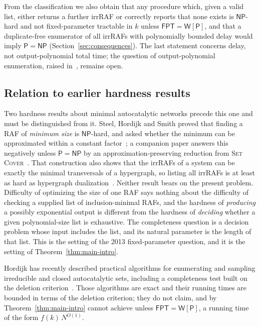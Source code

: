 \documentclass[11pt,a4paper]{article}
\theoremstyle{plain}
\theoremstyle{definition}
\theoremstyle{remark}
\newcommand{\NP}{\mathsf{NP}}
\newcommand{\Ptime}{\mathsf{P}}
\newcommand{\FPT}{\mathsf{FPT}}
\newcommand{\WP}{\mathsf{W[P]}}
\newcommand{\Nlen}{N}
\begin{document}
From the classification we also obtain that any procedure which, given a valid list, either returns a further irrRAF or correctly reports that none exists is $\NP$-hard and not fixed-parameter tractable in $k$ unless $\FPT=\WP$, and that a duplicate-free enumerator of all irrRAFs with polynomially bounded delay would imply $\Ptime=\NP$ (Section~\ref{sec:consequences}). The last statement concerns delay, not output-polynomial total time; the question of output-polynomial enumeration, raised in~\cite{steel2013minimal}, remains open.

\subsection*{Relation to earlier hardness results}

Two hardness results about minimal autocatalytic networks precede this one and must be distinguished from it. Steel, Hordijk and Smith proved that finding a RAF of \emph{minimum size} is $\NP$-hard, and asked whether the minimum can be approximated within a constant factor~\cite{steel2013minimal}; a companion paper answers this negatively unless $\Ptime=\NP$ by an approximation-preserving reduction from \textsc{Set Cover}~\cite{minraf2026}. That construction also shows that the irrRAFs of a system can be exactly the minimal transversals of a hypergraph, so listing all irrRAFs is at least as hard as hypergraph dualization~\cite{eiter1995identifying,fredman1996complexity}. Neither result bears on the present problem. Difficulty of optimizing the size of one RAF says nothing about the difficulty of checking a supplied list of inclusion-minimal RAFs, and the hardness of \emph{producing} a possibly exponential output is different from the hardness of \emph{deciding} whether a given polynomial-size list is exhaustive. The completeness question is a decision problem whose input includes the list, and its natural parameter is the length of that list. This is the setting of the 2013 fixed-parameter question, and it is the setting of Theorem~\ref{thm:main-intro}.

Hordijk has recently described practical algorithms for enumerating and sampling irreducible and closed autocatalytic sets, including a completeness test built on the deletion criterion~\cite{hordijk2026enumerating}. Those algorithms are exact and their running times are bounded in terms of the deletion criterion; they do not claim, and by Theorem~\ref{thm:main-intro} cannot achieve unless $\FPT=\WP$, a running time of the form $f(k)\,\Nlen^{O(1)}$.
\end{document}
